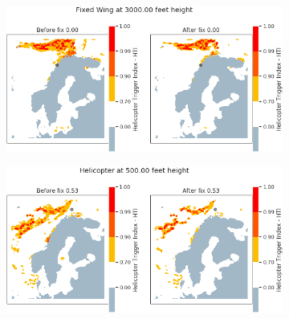 \begin{figure}[H]
    \begin{subfigure}{0.45\textwidth}
    \centering
    \includegraphics[width=\textwidth]{Figures/18.png}
    \caption{}
    \label{fig:HTI18}
    \end{subfigure}
\hfill
    \begin{subfigure}{0.45\textwidth}
    \centering
    \includegraphics[width=\textwidth]{Figures/19.png}
    \caption{}
    \label{fig:HTI19}
    \end{subfigure}


\end{figure}
